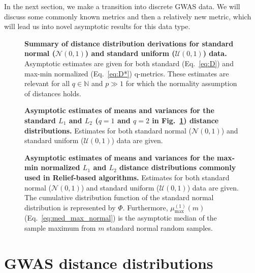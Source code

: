 \documentclass[10pt,letterpaper]{article}
\begin{document}
In the next section, we make a transition into discrete GWAS data. We will discuss some commonly known metrics and then a relatively new metric, which will lead us into novel asymptotic results for this data type.

\begin{figure}[H]
	\centering
	\caption{{\bf Summary of distance distribution derivations for standard normal ($\mathcal{N}(0,1)$) and standard uniform ($\mathcal{U}(0,1)$) data.} Asymptotic estimates are given for both standard (Eq.~\ref{eq:D}) and max-min normalized (Eq.~\ref{eq:D*}) q-metrics. These estimates are relevant for all $q \in \mathbb{N}$ and $p \gg 1$ for which the normality assumption of distances holds.}
	\label{tab:dist_distr_general1}
\end{figure}

\begin{figure}[H]
	\centering
	\caption{{\bf Asymptotic estimates of means and variances for the standard $L_1$ and $L_2$ ($q=1$ and $q=2$ in Fig.~\ref{tab:dist_distr_general1}) distance distributions.} Estimates for both standard normal ($\mathcal{N}(0,1)$) and standard uniform ($\mathcal{U}(0,1)$) data are given.}
	\label{tab:dist_distr_standardL1L2}
\end{figure}

\begin{figure}[H]
	\centering
	\caption{{\bf Asymptotic estimates of means and variances for the max-min normalized $L_1$ and $L_2$ distance distributions commonly used in Relief-based algorithms.} Estimates for both standard normal ($\mathcal{N}(0,1)$) and standard uniform ($\mathcal{U}(0,1)$) data are given. The cumulative distribution function of the standard normal distribution is represented by $\Phi$. Furthermore, $\mu^{(1)}_\text{max}(m)$ (Eq.~\ref{eq:med_max_normal}) is the asymptotic median of the sample maximum from $m$ standard normal random samples.}
	\label{tab:dist_distr_normalizedL1L2}
\end{figure}

\section{GWAS distance distributions}\label{sec:gwas_distances}
\end{document}

